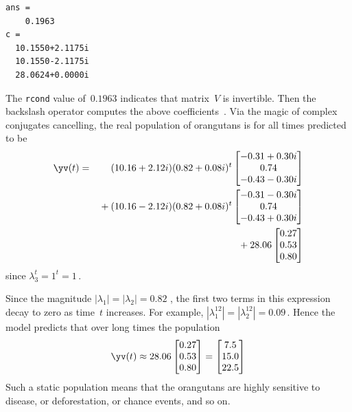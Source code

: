 \begin{example}
\begin{solution}
\begin{itemize}
\begin{verbatim}
ans =
    0.1963
c =
  10.1550+2.1175i
  10.1550-2.1175i
  28.0624+0.0000i
\end{verbatim}
The \verb|rcond| value of~\(0.1963\) indicates that matrix~\(V\) is invertible.
Then the backslash operator computes the above coefficients~\cv.
Via the magic of complex conjugates cancelling, the real population of orangutans is for all times predicted to be \twodp
\begin{eqnarray*}
\yv(t)&=&(10.16+2.12i)(0.82+0.08i)^t\begin{bmatrix} -0.31+0.30i   \\0.74
\\-0.43-0.30i \end{bmatrix}
\\&&{}
+(10.16-2.12i)(0.82+0.08i)^t\begin{bmatrix} -0.31-0.30i   \\0.74
\\-0.43+0.30i \end{bmatrix}
\\&&{}
+28.06\begin{bmatrix} 0.27
\\0.53
\\0.80 \end{bmatrix}
\end{eqnarray*}
since \(\lambda_3^t=1^t=1\)\,.

Since the magnitude \(|\lambda_1|=|\lambda_2|=0.82\) \twodp, 
the first two terms in this expression decay to zero as time~\(t\) increases.
For example, \(|\lambda_1^{12}|=|\lambda_2^{12}|=0.09\)\,.
Hence the model predicts that over long times the population
\begin{equation*}
\yv(t)\approx 28.06\begin{bmatrix} 0.27
\\0.53
\\0.80 \end{bmatrix}
=\begin{bmatrix} 7.5\\15.0\\22.5 \end{bmatrix}
\end{equation*}
Such a static population means that the orangutans are highly sensitive to disease, or deforestation, or chance events, and so on.


\end{itemize}
\end{solution}
\end{example}

